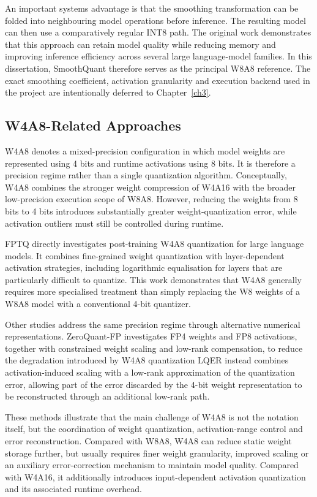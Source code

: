 An important systems advantage is that the smoothing transformation can
be folded into neighbouring model operations before inference. The
resulting model can then use a comparatively regular INT8 path. The
original work demonstrates that this approach can retain model quality
while reducing memory and improving inference efficiency across several
large language-model families. In this dissertation, SmoothQuant
therefore serves as the principal W8A8 reference. The exact smoothing
coefficient, activation granularity and execution backend used in the
project are intentionally deferred to Chapter~\ref{ch3}.

\subsection{W4A8-Related Approaches}
{W4A8} denotes a mixed-precision configuration in which model
weights are represented using 4 bits and runtime activations using
8 bits. It is therefore a precision regime rather than a single
quantization algorithm. Conceptually, W4A8 combines the stronger
weight compression of W4A16 with the broader low-precision execution
scope of W8A8. However, reducing the weights from 8 bits to 4 bits
introduces substantially greater weight-quantization error, while
activation outliers must still be controlled during runtime.

FPTQ directly investigates post-training W4A8 quantization for large
language models. It combines fine-grained weight quantization with
layer-dependent activation strategies, including logarithmic
equalisation for layers that are particularly difficult to quantize\cite{li2023fptqfinegrainedposttrainingquantization}. This work demonstrates that W4A8 generally requires
more specialised treatment than simply replacing the W8 weights of a
W8A8 model with a conventional 4-bit quantizer.

Other studies address the same precision regime through alternative
numerical representations. ZeroQuant-FP investigates FP4 weights and
FP8 activations, together with constrained weight scaling and
low-rank compensation\cite{wu2023zeroquantfpleapforwardllms}, to reduce the degradation introduced by W4A8
quantization LQER instead combines activation-induced
scaling with a low-rank approximation of the quantization error,
allowing part of the error discarded by the 4-bit weight representation
to be reconstructed through an additional low-rank path\cite{pmlr-v235-zhang24j}.

These methods illustrate that the main challenge of W4A8 is not the
notation itself, but the coordination of weight quantization,
activation-range control and error reconstruction. Compared with
W8A8, W4A8 can reduce static weight storage further, but usually
requires finer weight granularity, improved scaling or an auxiliary
error-correction mechanism to maintain model quality. Compared with
W4A16, it additionally introduces input-dependent activation
quantization and its associated runtime overhead.

